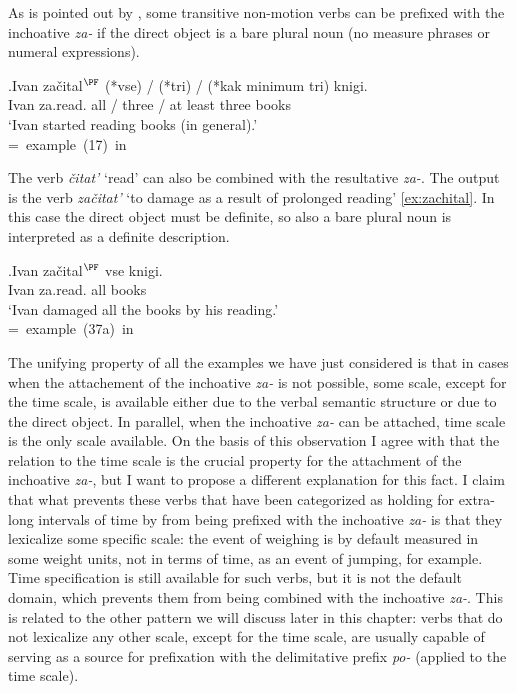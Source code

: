 As is pointed out by \citet[227]{Braginsky:08}, some transitive non-motion verbs can be prefixed with the inchoative \textit{za-} if the direct object is a bare plural noun (no measure phrases or numeral expressions).

\exg.Ivan za\v{c}ital$^{\PF}$ (*vse) / (*tri) / (*kak minimum tri) knigi.\\
Ivan za.read. all / three / at least three books\\
\trans `Ivan started reading books (in general).'\\\hbox{}\hfill\hbox{= example (17) in \citealt[227]{Braginsky:08}}

The verb \textit{\v{c}itat'} `read' can also be combined with the resultative \textit{za-}. The output is the verb \textit{za\v{c}itat'} `to damage as a result of prolonged reading' \ref{ex:zachital}. In this case the direct object must be definite, so also a bare plural noun is interpreted as a definite description.

\exg.\label{ex:zachital}Ivan za\v{c}ital$^{\PF}$ vse knigi.\\
Ivan za.read. all books\\
`Ivan damaged all the books by his reading.'\\\hbox{}\hfill\hbox{= example (37a) in \citealt[246]{Braginsky:08}}

The unifying property of all the examples we have just considered is that in cases when the attachement of the inchoative \textit{za-} is not possible, some scale, except for the time scale, is available either due to the verbal semantic structure or due to the direct object. In parallel, when the inchoative \textit{za-} can be attached, time scale is the only scale available. On the basis of this observation I agree with \citet{Paducheva:96} that the relation to the time scale is the crucial property for the attachment of the inchoative \textit{za-}, but I want to propose a different explanation for this fact. I claim that what prevents these verbs that have been categorized as holding for extra-long intervals of time by \citet{Paducheva:96} from being prefixed with the inchoative \textit{za-} is that they lexicalize some specific scale: the event of weighing is by default measured in some weight units, not in terms of time, as an event of jumping, for example. Time specification is still available for such verbs, but it is not the default domain, which prevents them from being combined with the inchoative \textit{za-}. This is related to the other pattern we will discuss later in this chapter: verbs that do not lexicalize any other scale, except for the time scale, are usually capable of serving as a source for prefixation with the delimitative prefix \textit{po-} (applied to the time scale). 

